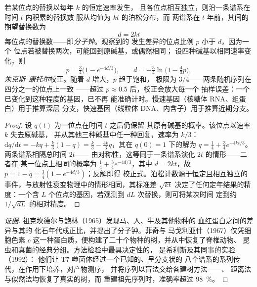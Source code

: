\begin{theorem}\label{thm:b2:phylogenetic-trees:clock}
若某位点的替换以每年 $k$ 的恒定速率发生，
且各位点相互独立，则沿一条谱系在时间 $t$ 内积累的替换数
服从均值为 $kt$ 的泊松分布，而
两谱系在 $t$ 年前，其间的期望替换数为
\[
d = 2kt
\]
每位点的替换数——即\emph{分子钟}。观察到的
发生差异的位点比例 $p$ 小于 $d$，因为一个
位点若被替换两次，可能回到原碱基，或偶然相同；
设四种碱基以相同速率变化，则
\[
p = \tfrac{3}{4}\bigl(1 - e^{-4d/3}\bigr), \qquad
d = -\tfrac{3}{4}\ln\bigl(1 - \tfrac{4}{3}p\bigr),
\]
\emph{朱克斯–康托尔}校正。随着 $d$ 增大，$p$ 趋于饱和，
极限为 $3/4$——两条随机序列在四分之一的位点上一致
——超过 $p \approx 0.5$ 后，校正会放大每一个
抽样误差：一个已变化到这种程度的基因，已不再
能准确计时。慢速基因（核糖体 RNA、组蛋白）用于推算深层
分支，快速基因（线粒体 DNA、内含子）用于推算近期分支。
\end{theorem}
\begin{proof}
设 $q(t)$ 为一位点在时间 $t$ 之后仍保留
其原有碱基的概率。该位点以速率 $k$ 失去原碱基，
并从其他三种碱基中任一种回复，速率为 $k/3$：
$\mathrm{d}q/\mathrm{d}t = -kq + \tfrac{k}{3}(1 - q) = \tfrac{k}{3} -
\tfrac{4k}{3}q$，其在 $q(0) = 1$ 下的解为 $q = \tfrac14 +
\tfrac34 e^{-4kt/3}$。两条谱系相隔总时间 $2t$——
由对称性，这等同于一条谱系演化 $2t$ 的情形——二者在
某一位点上相同的概率为 $\tfrac14 + \tfrac34 e^{-4d/3}$，其中 $d =
2kt$，故 $p = 1 - q = \tfrac34(1 - e^{-4d/3})$；反解即得
校正式。泊松计数源于恒定且相互独立的
事件，与放射性衰变物理中的情形相同，其标准差
$\sqrt{kt}$ 决定了任何定年结果的精度：一个含 $L$
个位点的基因，若观测到 $dL$ 次替换，则可将某次时间
定到约 $1/\sqrt{dL}$ 的相对精度。
\end{proof}
\begin{proof}[证据]
祖克坎德尔与鲍林（1965）发现马、人、牛及其他物种的
血红蛋白之间的差异与其的
化石年代成正比，并提出了分子钟。菲奇与
马戈利亚什（1967）仅凭细胞色素
$c$ 这一种蛋白质，便构建了二十个物种的树，并从中恢复了脊椎动物、
昆虫和真菌的经典分组。方法检验中最具决定性的，
是希利斯及其同事的实验（1992）：
他们让 T7 噬菌体经过一个已知的、呈分支状的
八个谱系的系列传代，在作用下培养，对产物测序，
并将序列以盲法交给各建树方法——、
距离法与似然法均恢复了真实的树，而
重建祖先序列时，准确率超过
\qty{98}{\%}。
\end{proof}

